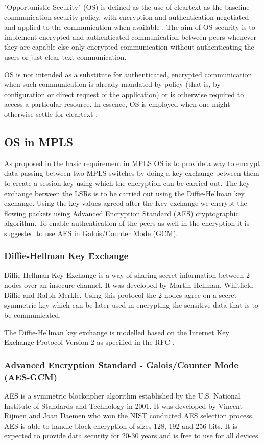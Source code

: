 "Opportunistic Security" (OS) is defined as the use of cleartext as the baseline communication security policy, with encryption and authentication negotiated and applied to the communication when available \cite{rfc7435}. The aim of OS security is to implement encrypted and authenticated communication between peers whenever they are capable else only encrypted communication without authenticating the users or just clear text communication.

OS is not intended as a substitute for authenticated, encrypted communication when such communication is already mandated by policy (that is, by configuration or direct request of the application) or is otherwise required to access a particular resource. In essence, OS is employed when one might otherwise settle for cleartext .

\subsection{OS in MPLS}
As proposed in \cite{mpls-os-internet-draft} the basic requirement in MPLS OS is to provide a way to encrypt data passing between two MPLS switches by doing a key exchange between them to create a session key using which the encryption can be carried out. The key exchange between the LSRs is to be carried out using the Diffie-Hellman key exchange. Using the key values agreed after the Key exchange we encrypt the flowing packets using Advanced Encryption Standard (AES) cryptographic algorithm. To enable authentication of the peers as well in the encryption it is suggested to use AES in Galois/Counter Mode (GCM).

\subsubsection{Diffie-Hellman Key Exchange}
Diffie-Hellman Key Exchange is a way of sharing secret information between 2 nodes over an insecure channel. It was developed by Martin Hellman, Whitfield Diffie and Ralph Merkle. Using this protocol the 2 nodes agree on a secret symmetric key which can be later used in encrypting the sensitive data that is to be communicated.

The Diffie-Hellman key exchange is modelled based on the Internet Key Exchange Protocol Version 2 as specified in the RFC \cite{rfc7296}.

\subsubsection{Advanced Encryption Standard - Galois/Counter Mode (AES-GCM)}
AES is a symmetric blockcipher algorithm established by the U.S. National Institute of Standards and Technology in 2001. It was developed by Vincent Rijmen and Joan Daemen who won the NIST conducted AES selection process. AES is able to handle block encryption of sizes 128, 192 and 256 bits. It is expected to provide data security for 20-30 years and is free to use for all devices.

